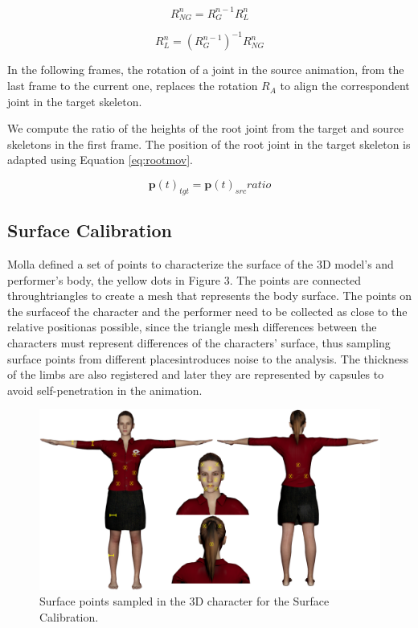 \documentclass{vgtc}
\makeatletter
\def\maxwidth{\ifdim\Gin@nat@width>\linewidth\linewidth
    \else\Gin@nat@width\fi}
\let\Oldincludegraphics\includegraphics
\renewcommand{\includegraphics}[1]{\Oldincludegraphics[width=.8\maxwidth]{#1}}
\makeatother
\begin{document}
\begin{equation}
    \label{eq:newglobal3}
    R_{NG}^{n} = R_{G}^{n-1} R_{L}^{n}
    \end{equation}

\begin{equation}
    \label{eq:newglobal4}
    R_{L}^{n} = (R_{G}^{n-1})^{-1} R_{NG}^{n}
    \end{equation}

In the following frames, the rotation of a joint in the source
animation, from the last frame to the current one, replaces the rotation
\(R_{A}\) to align the correspondent joint in the target skeleton.

We compute the ratio of the heights of the root joint from the target
and source skeletons in the first frame. The position of the root joint
in the target skeleton is adapted using Equation \ref{eq:rootmov}.

\begin{equation}
    \label{eq:rootmov}
    \mathbf{p}(t)_{tgt} = \mathbf{p}(t)_{src} ratio
    \end{equation}

    \subsection{Surface Calibration}\label{surface-calibration}

Molla\cite{molla} defined a set of points to characterize the surface of
the 3D model's and performer's body, the yellow dots in Figure 3. The
points are connected throughtriangles to create a mesh that represents
the body surface. The points on the surfaceof the character and the
performer need to be collected as close to the relative positionas
possible, since the triangle mesh differences between the characters
must represent differences of the characters' surface, thus sampling
surface points from different placesintroduces noise to the analysis.
The thickness of the limbs are also registered and later they are
represented by capsules to avoid self-penetration in the animation.

\begin{figure}
\centering
\includegraphics{../figures/TalitaPoints.png}
\caption{Surface points sampled in the 3D character for the Surface
Calibration.}
\end{figure}
\end{document}
